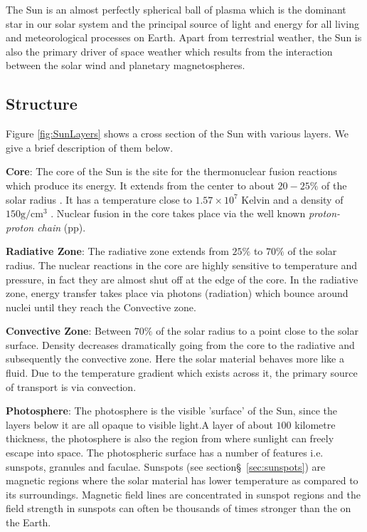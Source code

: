 The Sun is an almost perfectly spherical ball of plasma which is the dominant star in our solar system and 
the principal source of light and energy for all living and meteorological processes on Earth. Apart from 
terrestrial weather, the Sun is also the primary driver of space weather which results from the interaction 
between the solar wind and planetary magnetospheres.

\subsection{Structure}

Figure \ref{fig:SunLayers} shows a cross section of the Sun with various layers. We give a brief description 
of them below.

\textbf{Core}: The core of the Sun is the site for the thermonuclear fusion reactions which produce its energy. 
It extends from the center to about $20-25\%$ of the solar radius \citep{SolarAct}. It has a temperature close to 
$1.57 \times 10^7$ Kelvin and a density of $150 \text{g}/\text{cm}^3$ \citep{SolarCore}. Nuclear fusion in the core 
takes place via the well known \emph{proton-proton chain} (pp).

\textbf{Radiative Zone}: The radiative zone extends from $25\%$ to $70\%$ of the solar radius. The nuclear reactions 
in the core are highly sensitive to temperature and pressure, in fact they are almost shut off at the edge of the core. 
In the radiative zone, energy transfer takes place via photons (radiation) which bounce around nuclei until 
they reach the Convective zone.

\textbf{Convective Zone}: Between $70\%$ of the solar radius to a point close to the solar surface. Density decreases 
dramatically going from the core to the radiative and subsequently the convective zone. Here the solar material behaves more 
like a fluid. Due to the temperature gradient which exists across it, the primary source of transport is 
via convection.

\textbf{Photosphere}: The photosphere is the visible 'surface' of the Sun, since the layers below it are all opaque to 
visible light.A layer of about $100$ kilometre thickness, the photosphere is also the region from where sunlight can freely 
escape into space. The photospheric surface has a number of features i.e. sunspots, granules and faculae. 
Sunspots (see section\S~\ref{sec:sunspots}) are magnetic regions where the solar material has lower temperature as compared 
to its surroundings. Magnetic field lines are concentrated in sunspot regions and the field strength in sunspots can often 
be thousands of times stronger than the on the Earth.

